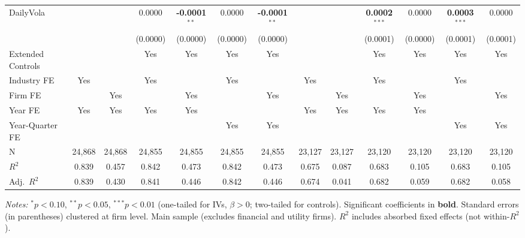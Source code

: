 \documentclass[11pt,a4paper]{article}
\begin{document}
\begin{table}[htbp]
\begin{tabular}{lcccccccccccc}
DailyVola &  &  & 0.0000 & \textbf{-0.0001}$^{**}$ & 0.0000 & \textbf{-0.0001}$^{**}$ &  &  & \textbf{0.0002}$^{***}$ & 0.0000 & \textbf{0.0003}$^{***}$ & 0.0000 \\
 &  &  & (0.0000) & (0.0000) & (0.0000) & (0.0000) &  &  & (0.0001) & (0.0000) & (0.0001) & (0.0001) \\
\midrule
Extended Controls &  &  & Yes & Yes & Yes & Yes &  &  & Yes & Yes & Yes & Yes \\
Industry FE & Yes &  & Yes &  & Yes &  & Yes &  & Yes &  & Yes &  \\
Firm FE &  & Yes &  & Yes &  & Yes &  & Yes &  & Yes &  & Yes \\
Year FE & Yes & Yes & Yes & Yes &  &  & Yes & Yes & Yes & Yes &  &  \\
Year-Quarter FE &  &  &  &  & Yes & Yes &  &  &  &  & Yes & Yes \\
\midrule
N & 24,868 & 24,868 & 24,855 & 24,855 & 24,855 & 24,855 & 23,127 & 23,127 & 23,120 & 23,120 & 23,120 & 23,120 \\
$R^2$ & 0.839 & 0.457 & 0.842 & 0.473 & 0.842 & 0.473 & 0.675 & 0.087 & 0.683 & 0.105 & 0.683 & 0.105 \\
Adj.~$R^2$ & 0.839 & 0.430 & 0.841 & 0.446 & 0.842 & 0.446 & 0.674 & 0.041 & 0.682 & 0.059 & 0.682 & 0.058 \\
\bottomrule
\end{tabular}
\begin{minipage}{\linewidth}
\vspace{2pt}\scriptsize
\textit{Notes:} $^{*}p<0.10$, $^{**}p<0.05$, $^{***}p<0.01$ (one-tailed for IVs, $\beta > 0$; two-tailed for controls).
 Significant coefficients in \textbf{bold}.
 Standard errors (in parentheses) clustered at firm level.
 Main sample (excludes financial and utility firms).
 $R^2$ includes absorbed fixed effects (not within-$R^2$).
\end{minipage}
\end{table}
\clearpage
\end{document}
